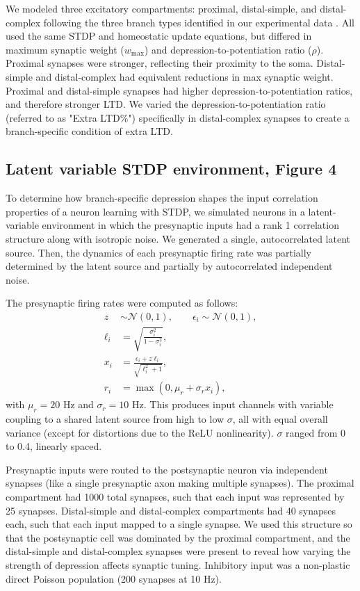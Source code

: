\documentclass[twocolumn]{theme/bioRxiv}
\begin{document}
We modeled three excitatory compartments: proximal, distal-simple, and distal-complex following the three branch types identified in our experimental data \citep{landauDendriticBranchStructure2022}. All used the same STDP and homeostatic update equations, but differed in maximum synaptic weight ($w_{\max}$) and depression-to-potentiation ratio ($\rho$). Proximal synapses were stronger, reflecting their proximity to the soma. Distal-simple and distal-complex had equivalent reductions in max synaptic weight. Proximal and distal-simple synapses had higher depression-to-potentiation ratios, and therefore stronger LTD. We varied the depression-to-potentiation ratio (referred to as "Extra LTD\%") specifically in distal-complex synapses to create a branch-specific condition of extra LTD.

\subsection*{Latent variable STDP environment, Figure 4}

To determine how branch-specific depression shapes the input correlation properties of a neuron learning with STDP, we simulated neurons in a latent-variable environment in which the presynaptic inputs had a rank 1 correlation structure along with isotropic noise. We generated a single, autocorrelated latent source. Then, the dynamics of each presynaptic firing rate was partially determined by the latent source and partially by autocorrelated independent noise.

The presynaptic firing rates were computed as follows: 
\begin{align*}
z &\sim \mathcal{N}(0,1), \qquad \epsilon_i \sim \mathcal{N}(0,1),\\
\ell_i &= \sqrt{\frac{\sigma_i^2}{1-\sigma_i^2}},\\
x_i &= \frac{\epsilon_i + z\ell_i}{\sqrt{\ell_i^2+1}},\\
r_i &= \max\!\left(0,\mu_r+\sigma_r x_i\right),
\end{align*}
with $\mu_r=20$ Hz and $\sigma_r=10$ Hz. This produces input channels with variable coupling to a shared latent source from high to low $\sigma$, all with equal overall variance (except for distortions due to the ReLU nonlinearity). $\sigma$ ranged from 0 to 0.4, linearly spaced.

Presynaptic inputs were routed to the postsynaptic neuron via independent synapses (like a single presynaptic axon making multiple synapses). The proximal compartment had 1000 total synapses, such that each input was represented by 25 synapses. Distal-simple and distal-complex compartments had 40 synapses each, such that each input mapped to a single synapse. We used this structure so that the postsynaptic cell was dominated by the proximal compartment, and the distal-simple and distal-complex synapses were present to reveal how varying the strength of depression affects synaptic tuning. Inhibitory input was a non-plastic direct Poisson population (200 synapses at 10 Hz).
\end{document}
